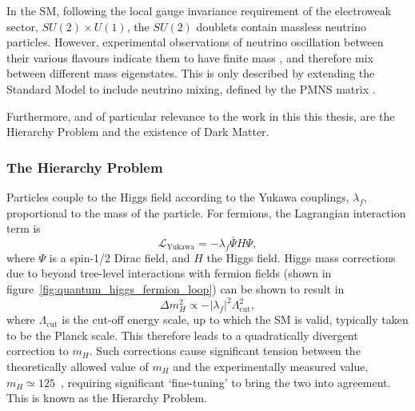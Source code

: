 In the SM, following the local gauge invariance requirement of the electroweak
sector, $SU(2)\times U(1)$, the $SU(2)$ doublets contain
massless neutrino particles. However, experimental observations of neutrino
oscillation between their various flavours indicate them to have finite mass
\cite{PhysRevLett.81.1562,PhysRevLett.89.011302}, and
therefore mix between different mass eigenstates. This is only described
by extending the Standard Model to include neutrino mixing, defined by the
PMNS matrix \cite{Altarelli:2002hx}.

Furthermore, and of particular relevance to the work in this this thesis, are
the Hierarchy Problem and the existence of Dark Matter.

\subsubsection{The Hierarchy Problem}


Particles couple to the Higgs field according to the Yukawa couplings,
$\lambda_f$,
proportional to the mass of the particle. For fermions, the Lagrangian
interaction term is
% 
\begin{equation}
\mathcal{L}_\text{Yukawa} = - \lambda_f \bar{\Psi}H\Psi,
\end{equation}
% 
where $\Psi$ is a spin-1/2 Dirac field, and $H$ the Higgs field. Higgs mass
corrections due to beyond tree-level interactions with fermion
fields (shown in figure~\ref{fig:quantum_higgs_fermion_loop}) can be shown to
result in
% 
\begin{equation}
\Delta m_H^2 \propto -|\lambda_f|^2 \Lambda_{\text{cut}}^2,
\label{eq:higgs_corr_hierarchy}
\end{equation}
% 
where $\Lambda_{\text{cut}}$ is the cut-off energy scale, up to which the SM is
valid, typically taken to be the Planck scale. This therefore leads to a
quadratically
divergent correction to $m_H$. Such corrections cause significant tension
between the theoretically allowed value of $m_H$ and the experimentally
measured value, $m_H \simeq 125$~\gev \cite{PhysRevLett.114.191803},
requiring significant `fine-tuning' to bring the two into agreement. This
is known as the Hierarchy Problem.

